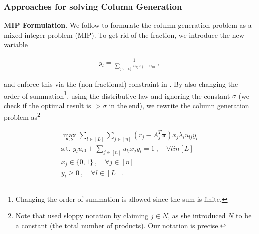 

\subsubsection{Approaches for solving Column Generation}

\textbf{MIP Formulation}. We follow \cite{Bront.2009} to formulate the column generation problem  as a mixed integer problem (MIP).  To get rid of the fraction, we introduce the new variable

\begin{align}
	y_l = \frac{1}{\sum_{j \in [n]} u_{lj}x_j + u_{l0}}~,
\end{align}

and enforce this via the (non-fractional) constraint in . By also changing the order of summation\footnote{Changing the order of summation is allowed since the sum is finite.}, using the distributive law and ignoring the constant $\sigma$ (we check if the optimal result is $> \sigma$ in the end), we rewrite the column generation problem  as\footnote{Note that \cite{Bront.2009} used sloppy notation by claiming $j\in N$, as she introduced $N$ to be a constant (the total number of products). Our notation is precise.}

\begin{align}
\max_{\boldsymbol{x}, \boldsymbol{y}} \sum_{l \in [L]}\sum_{j \in [n]} (r_j - A_j^T\boldsymbol{\pi}) x_j \lambda_l u_{lj} y_l\\
\text{s.t. }y_l u_{l0} + \sum_{j \in [n]} u_{lj} x_j y_l = 1 ~,\quad \forall l in [L] \label{const-frac}\\
x_j \in \{0, 1\} ~,\quad \forall j \in [n]\\
y_l \geq 0 ~,\quad \forall l \in [L]~.
\end{align}


